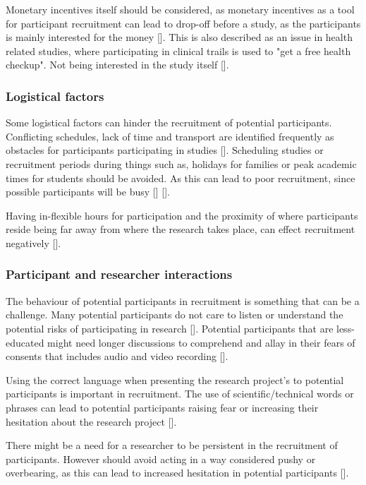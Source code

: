Monetary incentives itself should be considered, as monetary incentives as a tool for participant recruitment can lead to drop-off before a study, as the participants is mainly interested for the money [\cite{pkf_2018}]. This is also described as an issue in health related studies, where participating in clinical trails is used to "get a free health checkup". Not being interested in the study itself [\cite{nc_2020}].

\subsubsection{Logistical factors}
Some logistical factors can hinder the recruitment of potential participants. Conflicting schedules, lack of time and transport are identified frequently as obstacles for participants participating in studies [\cite{pkf_2018}]. Scheduling studies or recruitment periods during things such as, holidays for families or peak academic times for students should be avoided. As this can lead to poor recruitment, since possible participants will be busy [\cite{pkf_2018}] [\cite{nc_2020}]. 

Having in-flexible hours for participation and the proximity of where participants reside being far away from where the research takes place, can effect recruitment negatively [\cite{pkf_2018}].

\subsubsection{Participant and researcher interactions} \label{sec:participant-and-researcher-interactions}
The behaviour of potential participants in recruitment is something that can be a challenge. Many potential participants do not care to listen or understand the potential risks of participating in research [\cite{nc_2020}]. Potential participants that are less-educated might need longer discussions to comprehend and allay in their fears of consents that includes audio and video recording [\cite{nc_2020}].

Using the correct language when presenting the research project's to potential participants is important in recruitment. The use of scientific/technical words or phrases can lead to potential participants raising fear or increasing their hesitation about the research project [\cite{pkf_2018}]. 

There might be a need for a researcher to be persistent in the recruitment of participants. However should avoid acting in a way considered pushy or overbearing, as this can lead to increased hesitation in potential participants [\cite{pkf_2018}].

